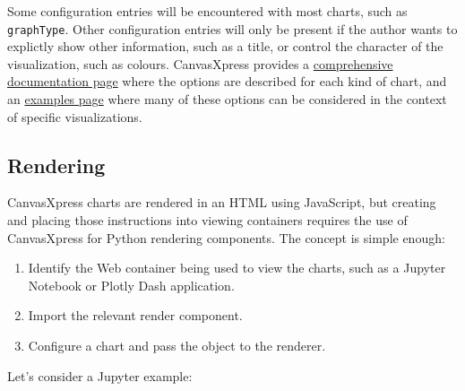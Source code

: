 \documentclass[
  letterpaper,
  DIV=11,
  numbers=noendperiod]{scrartcl}
\begin{document}
Some configuration entries will be encountered with most charts, such as
\texttt{graphType}. Other configuration entries will only be present if
the author wants to explictly show other information, such as a title,
or control the character of the visualization, such as colours.
CanvasXpress provides a
\href{https://canvasxpress.org/api/general.html}{comprehensive
documentation page} where the options are described for each kind of
chart, and an
\href{https://canvasxpress.org/examples/area-1.html}{examples page}
where many of these options can be considered in the context of specific
visualizations.

\hypertarget{rendering}{%
\subsection{Rendering}\label{rendering}}

CanvasXpress charts are rendered in an HTML using JavaScript, but
creating and placing those instructions into viewing containers requires
the use of CanvasXpress for Python rendering components. The concept is
simple enough:

\begin{enumerate}
\def\labelenumi{\arabic{enumi}.}
\item
  Identify the Web container being used to view the charts, such as a
  Jupyter Notebook or Plotly Dash application.
\item
  Import the relevant render component.
\item
  Configure a chart and pass the object to the renderer.
\end{enumerate}

Let's consider a Jupyter example:
\end{document}
